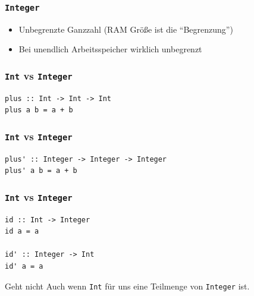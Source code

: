 \begin{frame}
\frametitle{\lstinline|Integer|}
\begin{block}{\vspace*{-3ex}}
\begin{itemize}
  \item Unbegrenzte Ganzzahl (RAM Größe ist die "`Begrenzung"')
  \item Bei unendlich Arbeitsspeicher wirklich unbegrenzt
\end{itemize}
\end{block}
\end{frame}

\begin{frame}[fragile]
\frametitle{\lstinline|Int| vs \lstinline|Integer|} 
\begin{lstlisting}
plus :: Int -> Int -> Int
plus a b = a + b
\end{lstlisting}
\end{frame}

\begin{frame}[fragile]
\frametitle{\lstinline|Int| vs \lstinline|Integer|} 
\begin{lstlisting}
plus' :: Integer -> Integer -> Integer
plus' a b = a + b
\end{lstlisting}
\end{frame}

\begin{frame}[fragile]
\frametitle{\lstinline|Int| vs \lstinline|Integer|} 
\begin{lstlisting}
id :: Int -> Integer
id a = a

id' :: Integer -> Int
id' a = a
\end{lstlisting}
\begin{alertblock}{Geht nicht}
Auch wenn \lstinline|Int| für uns eine Teilmenge von \lstinline|Integer| ist.
\end{alertblock}
\end{frame}

